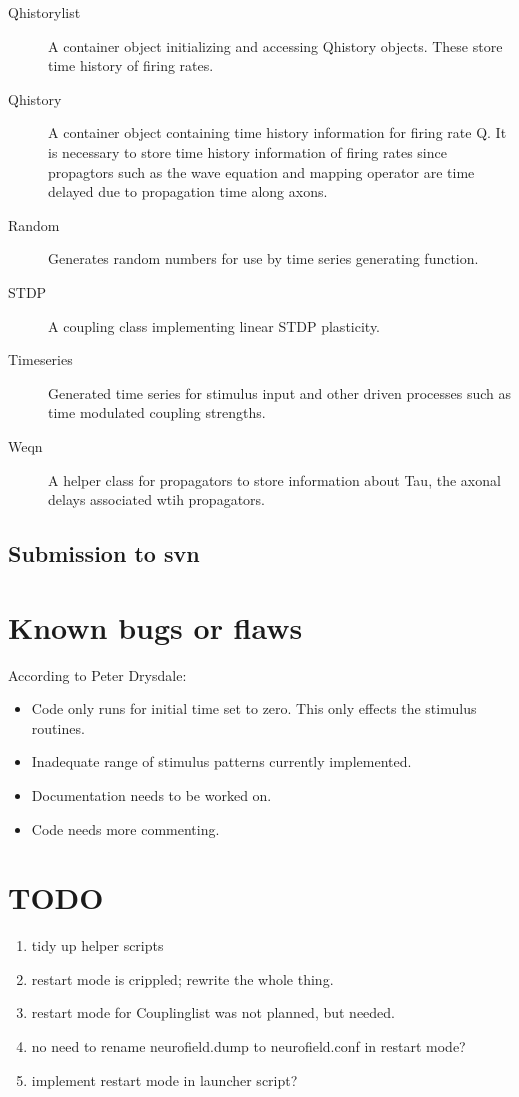 \documentclass[12pt,a4paper]{article}
\begin{document}
\begin{description}
\item[Qhistorylist] A container object initializing and accessing Qhistory objects. These store time history of firing rates.
\item[Qhistory] A container object containing time history information for firing rate Q. It is necessary to store time history information of firing rates since propagtors such as the wave equation and mapping operator are time delayed due to propagation time along axons.
\item[Random] Generates random numbers for use by time series generating function.
\item[STDP] A coupling class implementing linear STDP plasticity.
\item[Timeseries] Generated time series for stimulus input and other driven processes such as time modulated coupling strengths.
\item[Weqn] A helper class for propagators to store information about Tau, the axonal delays associated wtih propagators.
\end{description}

\subsection{Submission to svn}

\section{Known bugs or flaws}
According to Peter Drysdale:
\begin{itemize}
\item Code only runs for initial time set to zero. This only effects the stimulus routines.
\item Inadequate range of stimulus patterns currently implemented.
\item Documentation needs to be worked on.
\item Code needs more commenting.
\end{itemize}

\section{TODO}
\begin{enumerate}
\item tidy up helper scripts
\item restart mode is crippled; rewrite the whole thing.
\item restart mode for Couplinglist was not planned, but needed.
\item no need to rename neurofield.dump to neurofield.conf in restart mode?
\item implement restart mode in launcher script?
\end{enumerate}
\end{document}
